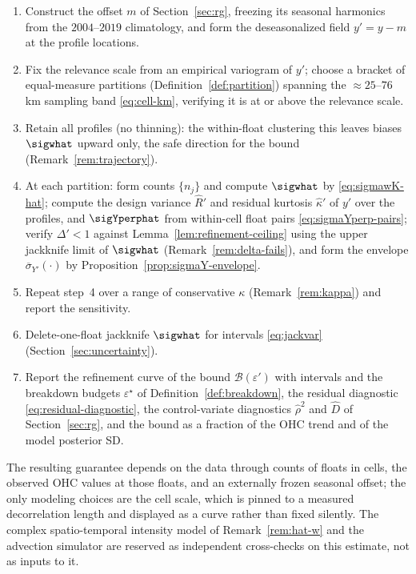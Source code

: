 \begin{enumerate}
\item Construct the offset $m$ of Section~\ref{sec:rg}, freezing its
  seasonal harmonics from the $2004$--$2019$ climatology, and form the
  deseasonalized field $y'=y-m$ at the profile locations.
\item Fix the relevance scale from an empirical variogram of $y'$;
  choose a bracket of equal-measure partitions
  (Definition~\ref{def:partition}) spanning the ${\approx}25$--$76$\,km
  sampling band \eqref{eq:cell-km}, verifying it is at or above the
  relevance scale.
\item Retain all profiles (no thinning): the within-float clustering
  this leaves biases $\sigwhat$ upward only, the safe direction
  for the bound (Remark~\ref{rem:trajectory}).
\item At each partition: form counts $\{n_j\}$ and compute
  $\sigwhat$ by \eqref{eq:sigmawK-hat}; compute the design variance
  $\hat R'$ and residual kurtosis $\hat\kappa'$ of $y'$ over the
  profiles, and $\sigYperphat$ from within-cell float pairs
  \eqref{eq:sigmaYperp-pairs}; verify
  $\Delta'<1$ against Lemma~\ref{lem:refinement-ceiling} using the upper
  jackknife limit of $\sigwhat$ (Remark~\ref{rem:delta-fails}), and form
  the envelope $\overline{\sigma}_{Y'}(\cdot)$ by
  Proposition~\ref{prop:sigmaY-envelope}.
\item Repeat step~4 over a range of conservative $\kappa$
  (Remark~\ref{rem:kappa}) and report the sensitivity.
\item Delete-one-float jackknife $\sigwhat$ for intervals
  \eqref{eq:jackvar} (Section~\ref{sec:uncertainty}).
\item Report the refinement curve of the bound
  $\mathcal{B}(\varepsilon')$ with intervals and the breakdown budgets
  $\varepsilon^{\star}$ of Definition~\ref{def:breakdown}, the residual
  diagnostic \eqref{eq:residual-diagnostic}, the control-variate
  diagnostics $\hat\rho^2$ and $\hat D$ of Section~\ref{sec:rg}, and the
  bound as a fraction of the OHC trend and of the model posterior SD.
\end{enumerate}

The resulting guarantee depends on the data through counts of floats in
cells, the observed OHC values at those floats, and an externally frozen
seasonal offset; the only modeling choices are the cell scale, which is
pinned to a measured
decorrelation length and displayed as a curve rather than fixed
silently. The complex spatio-temporal intensity model of
Remark~\ref{rem:hat-w} and the advection simulator are reserved as
independent cross-checks on this estimate, not as inputs to it.
